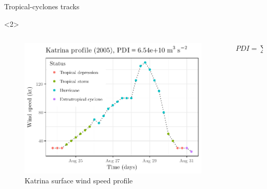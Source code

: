 \begin{frame}{Tropical-cyclones tracks}
\begin{onlyenv}<2>
\vspace{-0.9cm}
\begin{columns}[c] %
	\begin{column}{.65\textwidth}
	\begin{figure}[H]
		\centering
		\includegraphics[scale=0.6]{images/track-storm-katrina}
		\caption{Katrina surface wind speed profile}
		\label{fig:figure1}
	\end{figure}
	\end{column}%
	\hfill%
	\begin{column}{.35\textwidth}
	\begin{align}\label{eq:pdi-bis}
		PDI = \sum_{t} v_{t}^{3} \Delta t
	\end{align}
	\end{column}%
\end{columns}
\end{onlyenv}

\end{frame}

